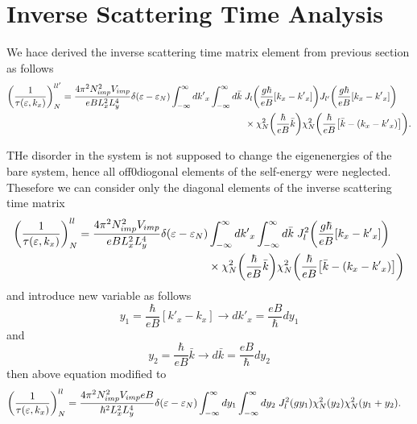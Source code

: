 \section{Inverse Scattering Time Analysis}

We hace derived the inverse scattering time matrix element from previous section as follows
\begin{equation} \label{5.1}
  \begin{aligned}
    \qty(\frac{1}{\tau(\varepsilon,k_x)})^{ll'}_{N} =
    \frac { 4\pi^2 N_{imp}^2 V_{imp}}{eB L_x^2 L_y^4}
    \delta(\varepsilon - \varepsilon_{N})
    \int_{-\infty}^{\infty} d {k'}_x
    \int_{-\infty}^{\infty} d\bar{k} \;
    &
    J_l\qty(\frac{g\hbar}{eB}[{k}_x - {k'}_x])
    J_{l'}\qty(\frac{g\hbar}{eB}[{k}_x - {k'}_x]) \\
    & \times
    {\chi}^2_{N}\qty(\frac{\hbar}{eB}\bar{k})
    {\chi}^2_{N}\qty(\frac{\hbar}{eB}
    \qty[\bar{k} - ({k}_x  - {k'}_x)]).
  \end{aligned}
\end{equation}

\noindent
THe disorder in the system is not supposed to change the eigenenergies of the bare system, hence all off0diogonal elements of the self-energy were neglected. Thesefore we can consider only the diagonal elements of the inverse scattering time matrix
\begin{equation} \label{5.2}
  \begin{aligned}
    \qty(\frac{1}{\tau(\varepsilon,k_x)})^{ll}_{N} =
    \frac { 4\pi^2 N_{imp}^2 V_{imp}}{eB L_x^2 L_y^4}
    \delta(\varepsilon - \varepsilon_{N}) &
    \int_{-\infty}^{\infty} d {k'}_x
    \int_{-\infty}^{\infty} d\bar{k} \;
    J_l^2\qty(\frac{g\hbar}{eB}[{k}_x - {k'}_x])
    \\
    & \times
    {\chi}^2_{N}\qty(\frac{\hbar}{eB}\bar{k})
    {\chi}^2_{N}\qty(\frac{\hbar}{eB}
    \qty[\bar{k} - ({k}_x  - {k'}_x)])
  \end{aligned}
\end{equation}
and introduce new variable as follows
\begin{equation} \label{5.3}
    y_1 = \frac{\hbar}{eB}[{k'}_x - k_x] \longrightarrow
    d{k'}_x = \frac{eB}{\hbar}dy_1
\end{equation}
and
\begin{equation} \label{5.4}
    y_2 = \frac{\hbar}{eB}\bar{k} \longrightarrow
    d\bar{k} = \frac{eB}{\hbar}dy_2
\end{equation}
then above equation modified to
\begin{equation} \label{5.5}
  \begin{aligned}
    \qty(\frac{1}{\tau(\varepsilon,k_x)})^{ll}_{N} =
    \frac { 4\pi^2 N_{imp}^2 V_{imp} eB}{\hbar^2 L_x^2 L_y^4}
    \delta(\varepsilon - \varepsilon_{N}) &
    \int_{-\infty}^{\infty} dy_1
    \int_{-\infty}^{\infty} dy_2 \;
    J_l^2\qty({gy_1})
    {\chi}^2_{N}\qty(y_2)
    {\chi}^2_{N}\qty(y_1 + y_2).
  \end{aligned}
\end{equation}

